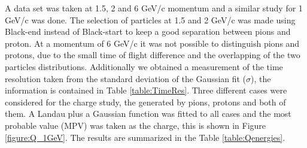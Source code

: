 	\begin{table}[!h]
	  \centering
		\caption{Charge measured for pions, protons and sum of both. For 6 GeV/c momentum is not possible to distinguish the particles
		using the time of flight technique.}
		\label{table:Qenergies}
	\end{table}
	

	A data set was taken at 1.5, 2 and 6 GeV/c momentum and a similar study for 1 GeV/c was done. The selection of particles at 1.5 and 2 GeV/c was made using Black-end instead of Black-start to keep a good separation between pions and proton. At a momentum of 6 GeV/c it was not possible to distinguish pions and protons, due to the small time of  flight difference and the overlapping of the two particles distributions. Additionally we obtained a measurement of the time resolution taken from the standard deviation of the Gaussian fit ($\sigma$), the information is contained in Table \ref{table:TimeRes}.
	Three different cases were considered for the charge study, the generated by pions, protons and both of them.
	A Landau plus a Gaussian function was fitted to all cases and the most probable value (MPV) was taken as the charge, this is shown in Figure \ref{figure:Q_1GeV}. The results are summarized in the Table \ref{table:Qenergies}.

